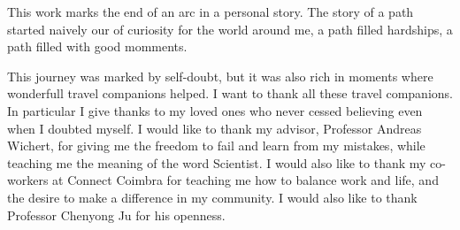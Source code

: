 
\begin{acknowledgments} 

This work marks the end of an arc in a personal story. The story of a path started naively our of curiosity for the world around me, a path filled hardships, a path filled with good momments.

This journey was marked by self-doubt, but it was also rich in moments where wonderfull travel companions helped. I want to thank all these travel companions.
In particular I give thanks to my loved ones who never cessed believing even when I doubted myself.
I would like to thank my advisor, Professor Andreas Wichert, for giving me the freedom to fail and learn from my mistakes, while teaching me the meaning of the word Scientist.
I would also like to thank my co-workers at Connect Coimbra for teaching me how to balance work and life, and the desire to make a difference in my community.
I would also like to thank Professor Chenyong Ju for his openness.
 
\end{acknowledgments}
\clearpage
\thispagestyle{empty}
\cleardoublepage